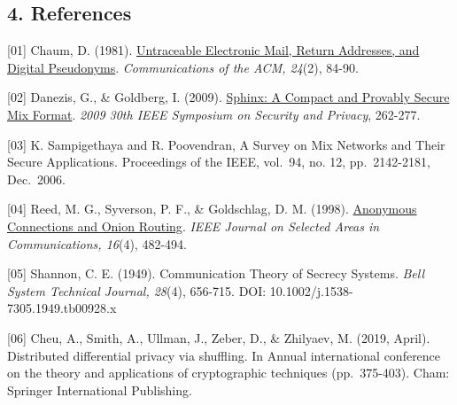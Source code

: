 \subsection{4. References}\label{references}

{[}01{]} Chaum, D. (1981).
\href{https://www.freehaven.net/anonbib/cache/chaum-mix.pdf}{Untraceable
Electronic Mail, Return Addresses, and Digital Pseudonyms}.
\emph{Communications of the ACM, 24}(2), 84-90.

{[}02{]} Danezis, G., \& Goldberg, I. (2009).
\href{https://cypherpunks.ca/~iang/pubs/Sphinx_Oakland09.pdf}{Sphinx: A
Compact and Provably Secure Mix Format}. \emph{2009 30th IEEE Symposium
on Security and Privacy}, 262-277.

{[}03{]} K. Sampigethaya and R. Poovendran, A Survey on Mix Networks and
Their Secure Applications. Proceedings of the IEEE, vol.~94, no. 12,
pp.~2142-2181, Dec.~2006.

{[}04{]} Reed, M. G., Syverson, P. F., \& Goldschlag, D. M. (1998).
\href{https://www.onion-router.net/Publications/JSAC-1998.pdf}{Anonymous
Connections and Onion Routing}. \emph{IEEE Journal on Selected Areas in
Communications, 16}(4), 482-494.

{[}05{]} Shannon, C. E. (1949). Communication Theory of Secrecy Systems.
\emph{Bell System Technical Journal, 28}(4), 656-715. DOI:
10.1002/j.1538-7305.1949.tb00928.x

{[}06{]} Cheu, A., Smith, A., Ullman, J., Zeber, D., \& Zhilyaev, M.
(2019, April). Distributed differential privacy via shuffling. In Annual
international conference on the theory and applications of cryptographic
techniques (pp.~375-403). Cham: Springer International Publishing.
